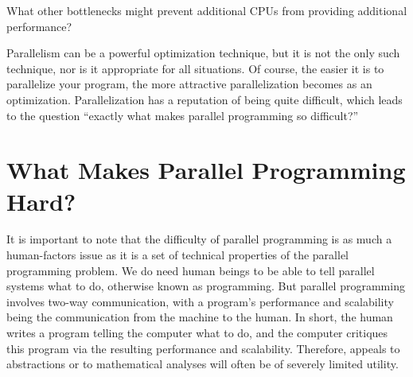 \QuickQuiz{}
	What other bottlenecks might prevent additional CPUs from
	providing additional performance?
 \QuickQuizEnd

Parallelism can be a powerful optimization technique, but
it is not the only such technique, nor is it appropriate for all
situations.
Of course, the easier it is to parallelize your program, the
more attractive parallelization becomes as an optimization.
Parallelization has a reputation of being quite difficult,
which leads to the question ``exactly what makes parallel
programming so difficult?''

\section{What Makes Parallel Programming Hard?}
\label{sec:intro:What Makes Parallel Programming Hard?}


It is important to note that the difficulty of parallel programming
is as much a human-factors issue as it is a set of technical properties of the
parallel programming problem.
We do need human beings to be able to tell parallel
systems what to do, otherwise known as programming.
But parallel programming involves two-way communication, with
a program's performance and scalability being the communication from
the machine to the human.
In short, the human writes a program telling the computer what to do,
and the computer critiques this program via the resulting performance and
scalability.
Therefore, appeals to abstractions or to mathematical analyses will
often be of severely limited utility.

